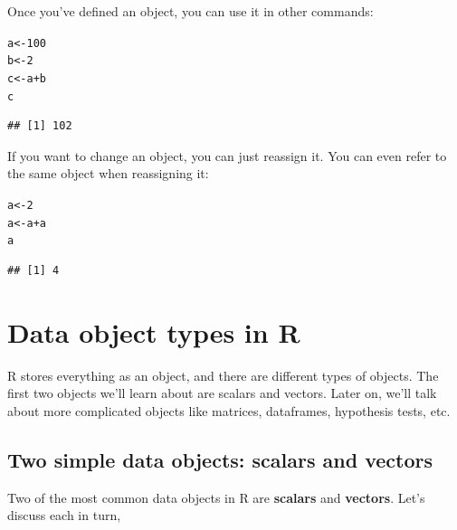 \documentclass{tufte-book}\usepackage[]{graphicx}\usepackage[]{color}
\makeatletter
\newcommand{\hlnum}[1]{\textcolor[rgb]{0.686,0.059,0.569}{#1}}%
\newcommand{\hlopt}[1]{\textcolor[rgb]{0,0,0}{#1}}%
\newcommand{\hlstd}[1]{\textcolor[rgb]{0.345,0.345,0.345}{#1}}%
\newcommand{\hlkwb}[1]{\textcolor[rgb]{0.69,0.353,0.396}{#1}}%
\newenvironment{kframe}{%
 \def\at@end@of@kframe{}%
 \ifinner\ifhmode%
  \def\at@end@of@kframe{\end{minipage}}%
  \begin{minipage}{\columnwidth}%
 \fi\fi%
 \def\FrameCommand##1{\hskip\@totalleftmargin \hskip-\fboxsep
 \colorbox{shadecolor}{##1}\hskip-\fboxsep
     \hskip-\linewidth \hskip-\@totalleftmargin \hskip\columnwidth}%
 \MakeFramed {\advance\hsize-\width
   \@totalleftmargin\z@ \linewidth\hsize
   \@setminipage}}%
 {\par\unskip\endMakeFramed%
 \at@end@of@kframe}
\newenvironment{knitrout}{}{} %
\makeatother
\begin{document}
Once you've defined an object, you can use it in other commands:

\begin{knitrout}
\color{fgcolor}\begin{kframe}
\begin{alltt}
\hlstd{a} \hlkwb{<-} \hlnum{100}
\hlstd{b} \hlkwb{<-} \hlnum{2}
\hlstd{c} \hlkwb{<-} \hlstd{a} \hlopt{+} \hlstd{b}
\hlstd{c}
\end{alltt}
\begin{verbatim}
## [1] 102
\end{verbatim}
\end{kframe}
\end{knitrout}


If you want to change an object, you can just reassign it. You can even refer to the same object when reassigning it:


\begin{knitrout}
\color{fgcolor}\begin{kframe}
\begin{alltt}
\hlstd{a} \hlkwb{<-} \hlnum{2}
\hlstd{a} \hlkwb{<-} \hlstd{a} \hlopt{+} \hlstd{a}
\hlstd{a}
\end{alltt}
\begin{verbatim}
## [1] 4
\end{verbatim}
\end{kframe}
\end{knitrout}




\section{Data object types in R}

R stores everything as an object, and there are different types of objects. The first two objects we'll learn about are scalars and vectors. Later on, we'll talk about more complicated objects like matrices, dataframes, hypothesis tests, etc.

\subsection{Two simple data objects: scalars and vectors}

Two of the most common data objects in R are \textbf{scalars} and \textbf{vectors}. Let's discuss each in turn,
\end{document}
